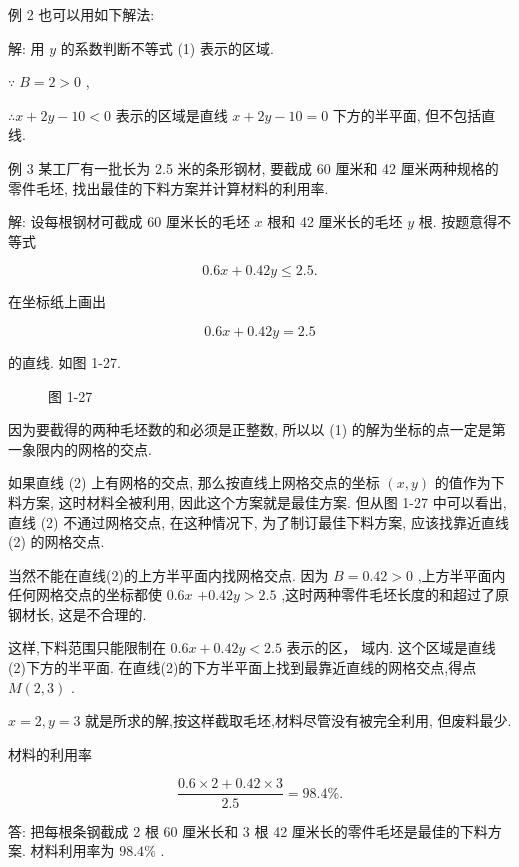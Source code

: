 \documentclass[lang=cn,newtx,12pt,scheme=chinese]{elegantbook}
\begin{document}
例 2 也可以用如下解法:

解: 用 \(y\) 的系数判断不等式 (1) 表示的区域.

\(\because \;B = 2 > 0\) ,

\(\therefore x + {2y} - {10} < 0\) 表示的区域是直线 \(x + {2y} - {10} = 0\) 下方的半平面, 但不包括直线.

例 3 某工厂有一批长为 2.5 米的条形钢材, 要截成 60 厘米和 42 厘米两种规格的零件毛坯, 找出最佳的下料方案并计算材料的利用率.

解: 设每根钢材可截成 60 厘米长的毛坯 \(x\) 根和 42 厘米长的毛坯 \(y\) 根. 按题意得不等式

\[
    {0.6x} + {0.42y} \leq {2.5}\text{.} \tag{1}
\]

在坐标纸上画出

\[
    {0.6x} + {0.42y} = {2.5} \tag{2}
\]

的直线. 如图 1-27.

\begin{figure}[h]
  \centering
  
  \caption{图 1-27}
\end{figure}

因为要截得的两种毛坯数的和必须是正整数, 所以以 (1) 的解为坐标的点一定是第一象限内的网格的交点.

如果直线 (2) 上有网格的交点, 那么按直线上网格交点的坐标 \(\left( {x,y}\right)\) 的值作为下料方案, 这时材料全被利用, 因此这个方案就是最佳方案. 但从图 1-27 中可以看出, 直线 (2) 不通过网格交点, 在这种情况下, 为了制订最佳下料方案, 应该找靠近直线 (2) 的网格交点.

当然不能在直线(2)的上方半平面内找网格交点. 因为 \(B = {0.42} > 0\) ,上方半平面内任何网格交点的坐标都使 \({0.6x}\) \(+ {0.42y} > {2.5}\) ,这时两种零件毛坯长度的和超过了原钢材长, 这是不合理的.

这样,下料范围只能限制在 \({0.6x} + {0.42y} < {2.5}\) 表示的区， 域内. 这个区域是直线(2)下方的半平面. 在直线(2)的下方半平面上找到最靠近直线的网格交点,得点 \(M\left( {2,3}\right)\) .

\(x = 2,y = 3\) 就是所求的解,按这样截取毛坯,材料尽管没有被完全利用, 但废料最少.

材料的利用率

\[
  \frac{{0.6} \times 2 + {0.42} \times 3}{2.5} = {98.4}\% \text{.}
\]

答: 把每根条钢截成 2 根 60 厘米长和 3 根 42 厘米长的零件毛坯是最佳的下料方案. 材料利用率为 \({98.4}\%\) .
\end{document}
